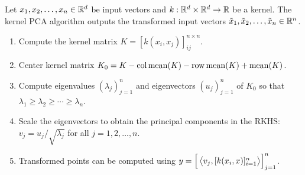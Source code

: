 
Let \(x_1, x_2, \dots, x_n \in \mathbb{R}^d\) be input vectors and \(k : \mathbb{R}^d \times \mathbb{R}^d \to \mathbb{R}\) be a kernel.
The kernel PCA algorithm outputs the transformed input vectors \(\tilde{x}_1, \tilde{x}_2, \dots, \tilde{x}_n \in \mathbb{R}^n\).
\begin{enumerate}
    \item Compute the kernel matrix \(K = [k(x_i, x_j)]_{ij}^{n \times n}\).
    \item Center kernel matrix \(K_0 = K - \operatorname{col\,mean}(K) - \operatorname{row\,mean}(K) + \operatorname{mean}(K)\).
    \item Compute eigenvalues \((\lambda_j)_{j=1}^n\) and eigenvectors \((u_j)_{j=1}^n\) of \(K_0\) so that \(\lambda_1 \geq \lambda_2 \geq \cdots \geq \lambda_n\).
    \item Scale the eigenvectors to obtain the principal components in the RKHS: \(v_j = u_j / \sqrt{\lambda_j}\) for all \(j = 1,2,\dots,n\).
    \item Transformed points can be computed using
    \(y = \left[\vphantom{\Big|}\left\langle \vphantom{\big|}v_j, [k(x_i,x)]_{i=1}^n \right\rangle\right]_{j=1}^n\).
\end{enumerate}

